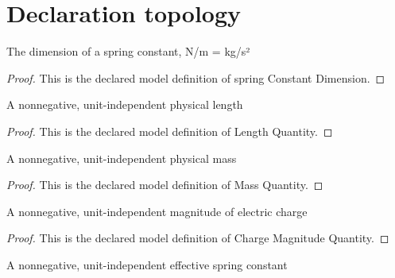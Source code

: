 \section{Declaration topology}
\begin{definition}
  \label{def:physics:phyx-mini-0658:phyxminiproblems-problemphyxmini0658-springconstantdimension}
  The dimension of a spring constant, N/m = kg/s²
\end{definition}
\begin{proof}
  This is the declared model definition of spring Constant Dimension.
\end{proof}
\begin{definition}
  \label{def:physics:phyx-mini-0658:phyxminiproblems-problemphyxmini0658-lengthquantity}
  A nonnegative, unit-independent physical length
\end{definition}
\begin{proof}
  This is the declared model definition of Length Quantity.
\end{proof}
\begin{definition}
  \label{def:physics:phyx-mini-0658:phyxminiproblems-problemphyxmini0658-massquantity}
  A nonnegative, unit-independent physical mass
\end{definition}
\begin{proof}
  This is the declared model definition of Mass Quantity.
\end{proof}
\begin{definition}
  \label{def:physics:phyx-mini-0658:phyxminiproblems-problemphyxmini0658-chargemagnitudequantity}
  A nonnegative, unit-independent magnitude of electric charge
\end{definition}
\begin{proof}
  This is the declared model definition of Charge Magnitude Quantity.
\end{proof}
\begin{definition}
  \label{def:physics:phyx-mini-0658:phyxminiproblems-problemphyxmini0658-springconstantquantity}
  A nonnegative, unit-independent effective spring constant
\end{definition}
